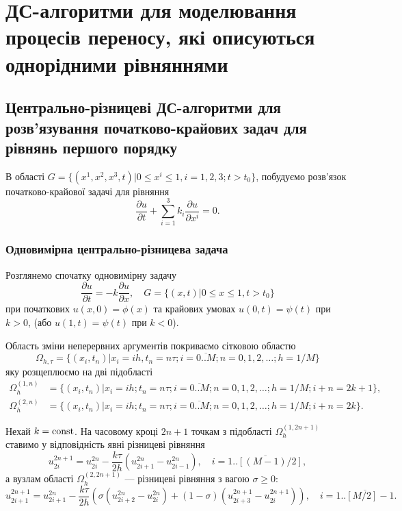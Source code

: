 \chapter{ДС-алгоритми для моделювання процесів переносу, які описуються однорідними рівняннями}

\section{Центрально-різницеві ДС-алгоритми для розв'язування по\-чат\-ко\-во-кра\-йо\-вих задач для рівнянь першого порядку}

В області $G = \{(x^1, x^2, x^3, t) | 0 \le x^i \le 1, i = 1, 2, 3; t > t_0\}$, побудуємо розв'язок початково-крайової задачі для рівняння
\begin{equation}
    \label{eq:l11.1}
    \frac{\partial u}{\partial t} + \sum_{i = 1}^3 k_i \frac{\partial u}{\partial x^i} = 0.
\end{equation}

\subsection{Одновимірна центрально-різницева задача}

Розглянемо спочатку одновимірну задачу
\begin{equation}
    \label{eq:l11.2}
    \frac{\partial u}{\partial t} = -k \frac{\partial u}{\partial x}, \quad G = \{(x, t) | 0 \le x \le 1, t > t_0\}
\end{equation}
при початкових $u(x, 0) = \phi(x)$ та крайових умовах $u(0, t) = \psi(t)$ при $k > 0$, (або $u(1, t) = \psi(t)$ при $k < 0$). \medskip

Область зміни неперервних аргументів покриваємо сітковою областю
\begin{equation*}
    \Omega_{h,\tau} = \{(x_i, t_n)| x_i = i h, t_n = n \tau; i = \overline{0..M}; n = 0,1,2,\ldots; h = 1/M\}
\end{equation*}
яку розщеплюємо на дві підобласті
\begin{align*}
    \Omega_h^{(1,n)} &= \{(x_i, t_n)| x_i = i h; t_n = n \tau; i = \overline{0..M}; n = 0,1,2,\ldots; h=1/M; i + n = 2 k + 1 \}, \\
    \Omega_h^{(2,n)} &= \{(x_i, t_n)| x_i = i h; t_n = n \tau; i = \overline{0..M}; n = 0,1,2,\ldots; h=1/M; i + n = 2 k \}.
\end{align*}

Нехай $k = \operatorname{const}$. На часовому кроці $2 n + 1$ точкам з підобласті $\Omega_h^{(1,2n+1)}$ ставимо у відповідність явні різницеві рівняння
\begin{equation}
    \label{eq:l11.3}
    u_{2i}^{2n+1} = u_{2i}^{2n} - \frac{k \tau}{2 h} \left( u_{2i+1}^{2n} - u_{2i-1}^{2n} \right), \quad i = \overline{1..[(M-1)/2]},
\end{equation}
а вузлам області $\Omega_h^{(2,2n+1)}$ --- різницеві рівняння з вагою $\sigma \ge 0$:
\begin{equation}
 	\label{eq:l11.4}
 	u_{2i+1}^{2n+1} = u_{2i+1}^{2n} - \frac{k \tau}{2 h} \left( \sigma \left( u_{2i+2}^{2n} - u_{2i}^{2n} \right) + (1 - \sigma) \left( u_{2i+3}^{2n+1} - u_{2i}^{2n+1} \right) \right), \quad i = \overline{1..[M/2]-1}.
\end{equation}

